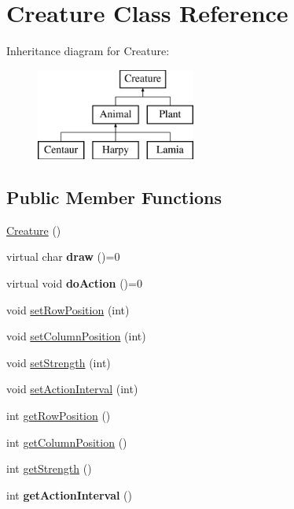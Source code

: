 \hypertarget{class_creature}{}\section{Creature Class Reference}
\label{class_creature}
Inheritance diagram for Creature\+:\begin{figure}[H]
\begin{center}
\leavevmode
\includegraphics[height=3.000000cm]{class_creature}
\end{center}
\end{figure}
\subsection*{Public Member Functions}
\begin{DoxyCompactItemize}
\item 
\hyperlink{class_creature_a597cc3b08ee17de46c3e7ec3cf0d9b58}{Creature} ()
\item 
virtual char {\bfseries draw} ()=0\hypertarget{class_creature_a5be2a9f038cd7641974462a80a009198}{}\label{class_creature_a5be2a9f038cd7641974462a80a009198}

\item 
virtual void {\bfseries do\+Action} ()=0\hypertarget{class_creature_ae40c732ab8eccea97404b9282fdd1138}{}\label{class_creature_ae40c732ab8eccea97404b9282fdd1138}

\item 
void \hyperlink{class_creature_a1bc33218a560eff8162a2e795e90251f}{set\+Row\+Position} (int)
\item 
void \hyperlink{class_creature_a4ab0c6b21b0826ed9691583eec078bec}{set\+Column\+Position} (int)
\item 
void \hyperlink{class_creature_a032ac31736090da076da0ec1466c27bf}{set\+Strength} (int)
\item 
void \hyperlink{class_creature_a3c30cf0d39904306da51584f52a79a41}{set\+Action\+Interval} (int)
\item 
int \hyperlink{class_creature_a8062f777315929e10e5d626e95366438}{get\+Row\+Position} ()
\item 
int \hyperlink{class_creature_addfbfaf75df9268fa1288c29c50abcd0}{get\+Column\+Position} ()
\item 
int \hyperlink{class_creature_aae311cca00cca409e3e790a96ad14b97}{get\+Strength} ()
\item 
int {\bfseries get\+Action\+Interval} ()\hypertarget{class_creature_a846d8ba60f1d799f474e106c08f4f786}{}\label{class_creature_a846d8ba60f1d799f474e106c08f4f786}

\end{DoxyCompactItemize}


